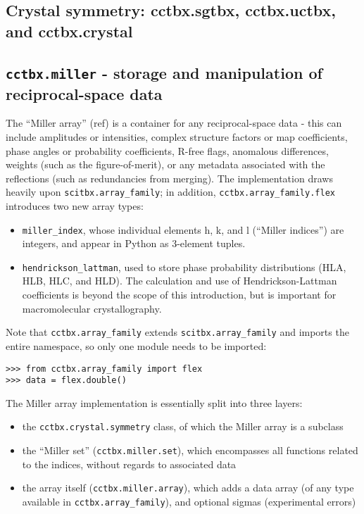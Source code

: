 \documentclass{article}
\begin{document}
\subsection{Crystal symmetry: cctbx.sgtbx, cctbx.uctbx, and cctbx.crystal}


\subsection{{\tt cctbx.miller} - storage and manipulation of reciprocal-space
data}

The “Miller array” (ref) is a container for any reciprocal-space data - this
can include amplitudes or intensities, complex structure factors or map
coefficients, phase angles or probability coefficients, R-free flags, anomalous
differences, weights (such as the figure-of-merit), or any metadata associated
with the reflections (such as redundancies from merging).  The implementation
draws heavily upon {\tt scitbx.array\_family}; in addition,
{\tt cctbx.array\_family.flex} introduces two new array types:

\begin{itemize}
  \item {\tt miller\_index}, whose individual elements h, k, and l (“Miller
    indices”) are integers, and appear in Python as 3-element tuples.
  \item {\tt hendrickson\_lattman}, used to store phase probability
    distributions (HLA, HLB, HLC, and HLD).  The calculation and use of
    Hendrickson-Lattman coefficients is beyond the scope of this introduction,
    but is important for macromolecular crystallography.
\end{itemize}

Note that {\tt cctbx.array\_family} extends {\tt scitbx.array\_family} and
imports the entire namespace, so only one module needs to be imported:

\begin{Verbatim}
>>> from cctbx.array_family import flex
>>> data = flex.double()
\end{Verbatim}


The Miller array implementation is essentially split into three layers:
\begin{itemize}
  \item the {\tt cctbx.crystal.symmetry} class, of which the Miller array is a subclass
  \item the “Miller set” ({\tt cctbx.miller.set}), which encompasses all functions related to the indices, without regards to associated data
  \item the array itself ({\tt cctbx.miller.array}), which adds a data array
    (of any type available in {\tt cctbx.array\_family}), and optional sigmas
    (experimental errors)
\end{itemize}
\end{document}
